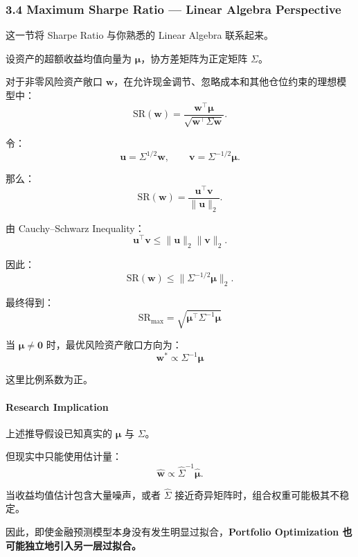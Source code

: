 \hypertarget{part-4-67-0001-maximum-sharpe-ratio-linear-algebra-perspective}{%
\subsubsection{3.4 Maximum Sharpe Ratio --- Linear Algebra Perspective}\label{part-4-67-0001-maximum-sharpe-ratio-linear-algebra-perspective}}

这一节将 Sharpe Ratio 与你熟悉的 Linear Algebra 联系起来。

设资产的超额收益均值向量为 \(\boldsymbol\mu\)，协方差矩阵为正定矩阵 \(\Sigma\)。

对于非零风险资产敞口 \(\boldsymbol w\)，在允许现金调节、忽略成本和其他仓位约束的理想模型中：
\[\mathrm{SR}(\boldsymbol w)
=
\frac{\boldsymbol w^\top\boldsymbol\mu}
{\sqrt{\boldsymbol w^\top\Sigma\boldsymbol w}}.\]

令：
\[\boldsymbol u=\Sigma^{1/2}\boldsymbol w,
\qquad
\boldsymbol v=\Sigma^{-1/2}\boldsymbol\mu.\]

那么：
\[\mathrm{SR}(\boldsymbol w)
=
\frac{\boldsymbol u^\top\boldsymbol v}
{\|\boldsymbol u\|_2}.\]

由 Cauchy--Schwarz Inequality：
\[\boldsymbol u^\top\boldsymbol v
\leq
\|\boldsymbol u\|_2\|\boldsymbol v\|_2.\]

因此：
\[\mathrm{SR}(\boldsymbol w)
\leq
\|\Sigma^{-1/2}\boldsymbol\mu\|_2.\]

最终得到：
\[\boxed{
\mathrm{SR}_{\max}
=
\sqrt{\boldsymbol\mu^\top\Sigma^{-1}\boldsymbol\mu}
}\]

当 \(\boldsymbol\mu\neq\boldsymbol 0\) 时，最优风险资产敞口方向为：
\[\boxed{
\boldsymbol w^*
\propto
\Sigma^{-1}\boldsymbol\mu
}\]

这里比例系数为正。

\hypertarget{part-4-67-0001-research-implication}{%
\paragraph{Research Implication}\label{part-4-67-0001-research-implication}}

上述推导假设已知真实的 \(\boldsymbol\mu\) 与 \(\Sigma\)。

但现实中只能使用估计量：
\[\hat{\boldsymbol w}
\propto
\hat\Sigma^{-1}\hat{\boldsymbol\mu}.\]

当收益均值估计包含大量噪声，或者 \(\hat\Sigma\) 接近奇异矩阵时，组合权重可能极其不稳定。

因此，即使金融预测模型本身没有发生明显过拟合，\textbf{Portfolio Optimization 也可能独立地引入另一层过拟合。}

